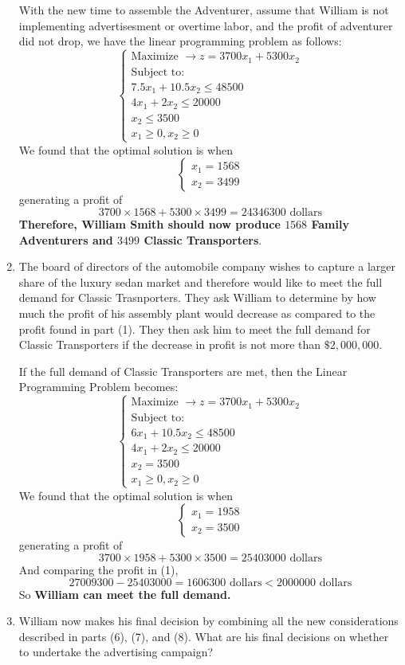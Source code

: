 \documentclass[
]{article}
\begin{document}
\begin{enumerate}
  With the new time to assemble the Adventurer, assume that William is
  not implementing advertisesment or overtime labor, and the profit of
  adventurer did not drop, we have the linear programming problem as
  follows: \[
  \begin{cases}
           \text{Maximize  } \rightarrow z = 3700x_1 + 5300x_2\\
           \text{Subject to:}\\
           7.5x_1 +10.5x_2 \leq 48500\\
           4x_1 + 2x_2 \leq 20000\\
           x_2 \leq 3500\\
           x_1 \geq 0, x_2 \geq 0
   \end{cases}
  \] We found that the optimal solution is when \[
  \begin{cases}
           x_1 = 1568\\ 
           x_2 = 3499
   \end{cases}
  \] generating a profit of \[
  3700 \times 1568 + 5300 \times 3499 = 24346300 \text{   dollars}
  \] \textbf{Therefore, William Smith should now produce \(1568\) Family
  Adventurers and \(3499\) Classic Transporters}.
\item
  The board of directors of the automobile company wishes to capture a
  larger share of the luxury sedan market and therefore would like to
  meet the full demand for Classic Trasnporters. They ask William to
  determine by how much the profit of his assembly plant would decrease
  as compared to the profit found in part (1). They then ask him to meet
  the full demand for Classic Transporters if the decrease in profit is
  not more than \(\$ 2,000,000\).

  If the full demand of Classic Transporters are met, then the Linear
  Programming Problem becomes: \[
  \begin{cases}
           \text{Maximize  } \rightarrow z = 3700x_1 + 5300x_2\\
           \text{Subject to:}\\
           6x_1 +10.5x_2 \leq 48500\\
           4x_1 + 2x_2 \leq 20000\\
           x_2 = 3500\\
           x_1 \geq 0, x_2 \geq 0
   \end{cases}
  \] We found that the optimal solution is when \[
  \begin{cases}
           x_1 = 1958\\ 
           x_2 = 3500
   \end{cases}
  \] generating a profit of \[
  3700 \times 1958 + 5300 \times 3500 = 25403000 \text{   dollars}
  \] And comparing the profit in (1), \[
  27009300 - 25403000 = 1606300 \text{ dollars} < 2000000 \text{ dollars}
  \] So \textbf{William can meet the full demand.}
\item
  William now makes his final decision by combining all the new
  considerations described in parts (6), (7), and (8). What are his
  final decisions on whether to undertake the advertising campaign?


\end{enumerate}
\end{document}
